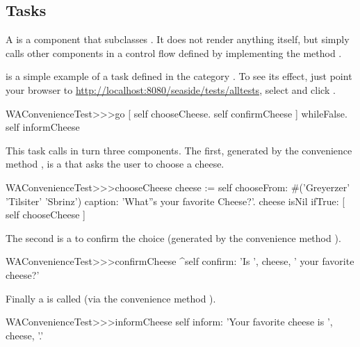 \documentclass[a4paper,10pt,twoside]{book}
\begin{document}
{{%
\subsection{Tasks}

A  is a component that subclasses .
It does not render anything itself, but simply calls other components in a control flow defined by implementing the method .

 is a simple example of a task defined in the category .
To see its effect, just point your browser to \url{http://localhost:8080/seaside/tests/alltests}, select  and click .

\begin{code}{}
WAConvenienceTest>>>go
	[ self chooseCheese.
	  self confirmCheese ] whileFalse.
	self informCheese
\end{code}

This task calls in turn three components.
The first, generated by the convenience method , is a  that asks the user to choose a cheese.

\begin{code}{}
WAConvenienceTest>>>chooseCheese
	cheese := self
		chooseFrom: #('Greyerzer' 'Tilsiter' 'Sbrinz')
		caption: 'What''s your favorite Cheese?'.
	cheese isNil ifTrue: [ self chooseCheese ]
\end{code}


The second is a  to confirm the choice (generated by the convenience method ).

\begin{code}{}
WAConvenienceTest>>>confirmCheese
	^self confirm: 'Is ', cheese,  ' your favorite cheese?'
\end{code}

Finally a  is called (via the convenience method ).

\begin{code}{}
WAConvenienceTest>>>informCheese
	self inform: 'Your favorite cheese is ', cheese, '.'
\end{code}

}}
\end{document}
